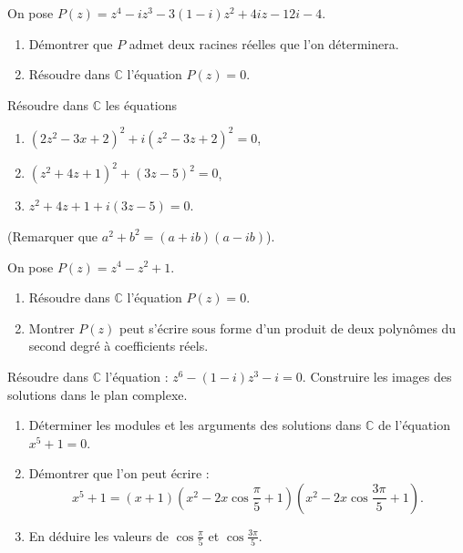 %
\begin{exo}
      On pose $P(z) = z^4 - i z^3 - 3 (1-i) z^2 + 4 i z - 12 i - 4 $.
      \begin{enumerate}
            \item D\'emontrer que $P$ admet deux racines r\'eelles que l'on d\'eterminera.
            \item R\'esoudre dans $\mathbb{C}$ l'\'equation $P(z) = 0$.
      \end{enumerate}
\end{exo}
%
\begin{exo}
      R\'esoudre dans $\mathbb{C}$ les \'equations 
      \begin{enumerate}
            \item $ (2z^2-3x+2)^2 + i(z^2-3z+2)^2 = 0 $,
            \item $ (z^2 + 4z + 1)^2 + (3z-5)^2 = 0 $,
            \item $ z^2 + 4z + 1 + i (3z - 5) = 0 $.
      \end{enumerate}
      (Remarquer que $a^2 + b^2 = (a+ib)(a-ib)$).
\end{exo}
%
\begin{exo}
      On pose $P(z) = z^4 - z^2 + 1$.
      \begin{enumerate}
            \item R\'esoudre dans $\mathbb{C}$ l'\'equation $P(z) = 0$.
            \item Montrer $P(z)$ peut s'\'ecrire sous forme d'un produit de 
                  deux polyn\^omes du second degr\'e \`a coefficients r\'eels.
      \end{enumerate}
\end{exo}
%
\begin{exo}
      R\'esoudre dans $\mathbb{C}$ l'\'equation : $z^6 - (1-i) z^3 - i = 0$.
      Construire les images des solutions dans le plan complexe.
\end{exo}
%
\begin{exo}
      \begin{enumerate}
            \item D\'eterminer les modules et les arguments des solutions dans $\mathbb{C}$ de l'\'equation $x^5+1=0$.
            \item D\'emontrer que l'on peut \'ecrire : 
                  \[
                  x^5+1= (x+1) \left( x^2-2x\cos \frac{\pi}{5} +1 \right) \left( x^2 - 2x\cos \frac{3\pi}{5} +1 \right) .
                  \]
            \item En d\'eduire les valeurs de $\cos \frac{\pi}{5}$ et $\cos \frac{3\pi}{5}$.
      \end{enumerate}
\end{exo}
